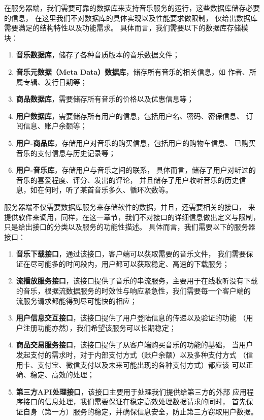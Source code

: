 在服务器端，我们需要可靠的数据库来支持音乐服务的运行，这些数据库储存必要的信息，
    在这里我们不对数据库的具体实现以及性能要求做限制，
    仅给出数据库需要满足的结构特性以及功能需求。
具体而言，我们需要以下的数据库存储模块：
    \begin{enumerate}
        \item \textbf{音乐数据库}，储存了各种音质版本的音乐数据文件；
        \item \textbf{音乐元数据（Meta Data）数据库}，储存所有音乐的相关信息，如
            作者、所属专辑、发行日期等；
        \item \textbf{商品数据库}，需要储存所有音乐的价格以及优惠信息等；
        \item \textbf{用户数据库}，需要储存所有用户的信息，包括用户名、密码、密保信息、
            订阅信息、账户余额等；
        \item \textbf{用户-商品库}，存储用户对音乐的购买信息，包括用户的购物车信息、
            已购买音乐的支付信息与历史记录等；
        \item \textbf{用户-音乐库}，存储用户与音乐之间的联系，
            具体而言，储存了用户对听过的音乐的喜爱程度、评分、发出的评论，
            并且储存了用户收听音乐的历史信息，如在何时，听了某首音乐多久、循环次数等。
    \end{enumerate}

服务器端不仅需要数据库服务来存储软件的数据，并且，还需要相关的接口，
    来提供软件来调用，同样，在这一章节，我们不对接口的详细信息做出定义与限制，
    只是给出接口的分类以及服务的功能性描述。
具体而言，我们需要以下的服务器接口：
\begin{enumerate}
    \item \textbf{音乐下载接口}，通过该接口，客户端可以获取需要的音乐文件，
        我们需要保证在尽可能多的时间段内，用户都可以获取稳定、高速的下载服务；
    \item \textbf{流播放服务接口}，该接口提供了音乐的串流服务，主要用于在线收听没有下载
        的音乐，根据流数据服务的时效性与响应紧急性，我们需要每一个客户端的
        流服务请求都能得到尽可能快的相应；
    \item \textbf{用户信息交互接口}，该接口提供了用户登陆信息的传递以及验证的功能
        （用户注册功能亦然），我们希望该服务可以长期稳定；
    \item \textbf{商品交易服务接口}，该接口提供了从客户端购买音乐的功能的基础，
        当用户发起支付的需求时，对于内部支付方式（账户余额）以及多种支付方式
        （信用卡、支付宝、微信支付以及未来可能出现的各种支付方式）都应该
        可以正确、稳定、高效的处理；
    \item \textbf{第三方API处理接口}，该接口主要用于处理我们提供给第三方的外部
        应用程序接口的信息处理，我们需要保证在稳定高效处理数据请求的同时，
        首先保证自身（第一方）服务的稳定，并确保信息安全，防止第三方窃取用户数据。
\end{enumerate}

